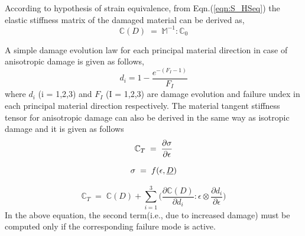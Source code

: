 \documentclass[a4paper,14pt]{extarticle}
\begin{document}
 According to hypothesis of strain equivalence, from Eqn.(\ref{eqn:S_HSeq}) the elastic stiffness matrix of the damaged material can be derived as,\\
 \begin{equation}
\mathbb{C}(D) \; = \; \mathbb{M}^{-1} : \mathbb{C}_{0}   
\label{Damaged_elasticity_matrix_2}
\end{equation}


A simple damage evolution law for each principal material direction in case of anisotropic damage is given as follows,
\begin{equation}
d_{i} = 1 - \frac{e^{-(F_{I} - 1)} }{F_{I}}  
\end{equation}
where $d_{i}$ (i = 1,2,3) and $F_{I}$ (I = 1,2,3) are damage evolution and failure undex in each principal material direction respectively.
The material tangent stiffness tensor for anisotropic damage can also be derived in the same way as isotropic damage and it is given as follows
\begin{equation*}
\large{ \mathbb{C}_{T}  \; = \;\frac{\partial \sigma}{\partial \epsilon}  }
\end{equation*}

\begin{equation*}
\large{\sigma  \; = \; f(\epsilon, \underline{D}) }
\end{equation*}

\begin{equation}
\mathbb{C}_{T}  \; = \; \mathbb{C}(D) + \sum_{i = 1}^{3} \Big( \frac{\partial \mathbb{C}(D) }{\partial d_{i}} : \epsilon \otimes \frac{\partial d_{i}}{\partial \epsilon }\Big) 
\end{equation}
In the above equation, the second term(i.e., due to increased damage) must be computed only if the corresponding failure mode is active.
\end{document}
